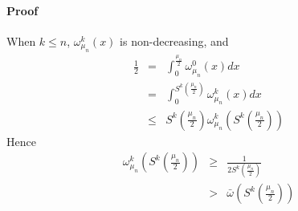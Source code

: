 \paragraph{Proof}
When $k \le n$, $\omega_{\mu_n}^k(x)$ is non-decreasing, and
 \begin{eqnarray}
     \frac{1}{2}  & = & \int_0^{\frac{\mu_n}{2}} \omega_{\mu_n}^0(x) dx \nonumber\\
                  & = &\int_0^{S^k \left(\frac{\mu_n}{2}\right)} \omega_{\mu_n}^k(x) dx \nonumber \\
                  &\le& S^k \left(\frac{\mu_n}{2}\right) \omega_{\mu_n}^k(S^k \left(\frac{\mu_n}{2}\right))
 \end{eqnarray} 
Hence
\begin{eqnarray}
\omega_{\mu_n}^k \left(S^k \left(\frac{\mu_n}{2}\right)\right) 
                  &\ge&  \frac{1}{2 S^k \left( \frac{\mu_n}{2}\right)} \nonumber\\
                  &>&  \bar{\omega} \left(S^k \left(\frac{\mu_n}{2}\right)\right) 
\end{eqnarray}



\cite{Wiggins2004}
\cite{Ottino2004}
\cite{Mezic2005}
\cite{Thiffeault2003-13}
\cite{Thiffeault2003-309}
\cite{Thiffeault2004}
\cite{Thiffeault2005}
\cite{Ashwin2002}
\cite{Boyd2004}
\cite{Diaconis1996}
\cite{Diaconis2001}
\cite{Diaconis2005}
\cite{Diaconis1986}
\cite{Hammarstr2005}
\cite{Fereday2002}
\cite{Tsang2005}
\cite{Haynes2005}
\cite{Pierrehumbert2000}
\cite{Percival1989}



